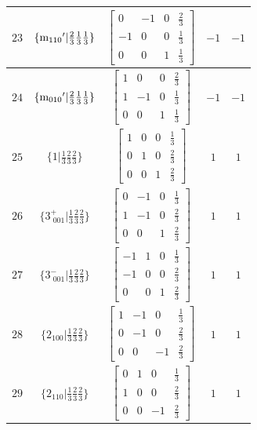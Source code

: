\documentclass[fleqn,8pt]{jsarticle}
\begin{document}
\begin{longtable}{ccccc}
$ 23 $ & $ \{{\rm m}_{110}{}'|\frac{2}{3} \frac{1}{3} \frac{1}{3}\} $ & $ \begin{bmatrix} 0 & -1 & 0 & \frac{2}{3} \\ -1 & 0 & 0 & \frac{1}{3} \\ 0 & 0 & 1 & \frac{1}{3} \end{bmatrix} $ & $ -1 $ & $ -1 $ \\ \hline
$ 24 $ & $ \{{\rm m}_{010}{}'|\frac{2}{3} \frac{1}{3} \frac{1}{3}\} $ & $ \begin{bmatrix} 1 & 0 & 0 & \frac{2}{3} \\ 1 & -1 & 0 & \frac{1}{3} \\ 0 & 0 & 1 & \frac{1}{3} \end{bmatrix} $ & $ -1 $ & $ -1 $ \\ \hline
$ 25 $ & $ \{1|\frac{1}{3} \frac{2}{3} \frac{2}{3}\} $ & $ \begin{bmatrix} 1 & 0 & 0 & \frac{1}{3} \\ 0 & 1 & 0 & \frac{2}{3} \\ 0 & 0 & 1 & \frac{2}{3} \end{bmatrix} $ & $ 1 $ & $ 1 $ \\ \hline
$ 26 $ & $ \{3^{+}_{\,\,001}|\frac{1}{3} \frac{2}{3} \frac{2}{3}\} $ & $ \begin{bmatrix} 0 & -1 & 0 & \frac{1}{3} \\ 1 & -1 & 0 & \frac{2}{3} \\ 0 & 0 & 1 & \frac{2}{3} \end{bmatrix} $ & $ 1 $ & $ 1 $ \\ \hline
$ 27 $ & $ \{3^{-}_{\,\,001}|\frac{1}{3} \frac{2}{3} \frac{2}{3}\} $ & $ \begin{bmatrix} -1 & 1 & 0 & \frac{1}{3} \\ -1 & 0 & 0 & \frac{2}{3} \\ 0 & 0 & 1 & \frac{2}{3} \end{bmatrix} $ & $ 1 $ & $ 1 $ \\ \hline
$ 28 $ & $ \{2{}_{100}|\frac{1}{3} \frac{2}{3} \frac{2}{3}\} $ & $ \begin{bmatrix} 1 & -1 & 0 & \frac{1}{3} \\ 0 & -1 & 0 & \frac{2}{3} \\ 0 & 0 & -1 & \frac{2}{3} \end{bmatrix} $ & $ 1 $ & $ 1 $ \\ \hline
$ 29 $ & $ \{2{}_{110}|\frac{1}{3} \frac{2}{3} \frac{2}{3}\} $ & $ \begin{bmatrix} 0 & 1 & 0 & \frac{1}{3} \\ 1 & 0 & 0 & \frac{2}{3} \\ 0 & 0 & -1 & \frac{2}{3} \end{bmatrix} $ & $ 1 $ & $ 1 $ \\ \hline

\end{longtable}
\end{document}
